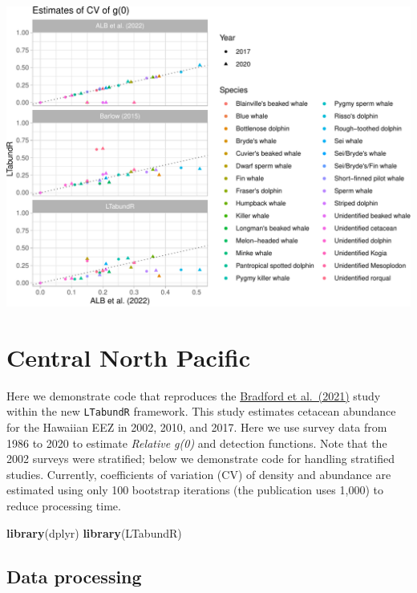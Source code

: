 \documentclass[
]{book}
\newenvironment{Shaded}{\begin{snugshade}}{\end{snugshade}}
\newcommand{\KeywordTok}[1]{\textcolor[rgb]{0.13,0.29,0.53}{\textbf{#1}}}
\newcommand{\NormalTok}[1]{#1}
\begin{document}
\includegraphics{figures/unnamed-chunk-387-1.pdf}

\hypertarget{case_cnp}{%
\chapter{Central North Pacific}\label{case_cnp}}

Here we demonstrate code that reproduces the \href{https://repository.library.noaa.gov/view/noaa/29004}{Bradford et al.~(2021)} study within the new \texttt{LTabundR} framework. This study estimates cetacean abundance for the Hawaiian EEZ in 2002, 2010, and 2017. Here we use survey data from 1986 to 2020 to estimate \emph{Relative g(0)} and detection functions. Note that the 2002 surveys were stratified; below we demonstrate code for handling stratified studies. Currently, coefficients of variation (CV) of density and abundance are estimated using only 100 bootstrap iterations (the publication uses 1,000) to reduce processing time.

\begin{Shaded}
\begin{Highlighting}[]
\KeywordTok{library}\NormalTok{(dplyr)}
\KeywordTok{library}\NormalTok{(LTabundR)}
\end{Highlighting}
\end{Shaded}

\hypertarget{data-processing-1}{%
\section*{Data processing}\label{data-processing-1}}
\end{document}
